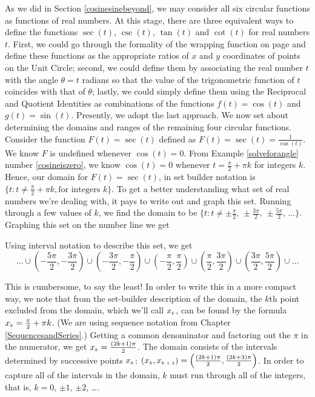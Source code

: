 \medskip

As we did in Section \ref{cosinesinebeyond}, we may consider all six circular functions as functions of real numbers. At this stage, there are three equivalent ways to define the functions $\sec(t)$, $\csc(t)$, $\tan(t)$ and $\cot(t)$ for real numbers $t$.  First, we could go through the formality of the wrapping function on page \pageref{wrappingfunction} and define these functions as the appropriate ratios of  $x$ and $y$ coordinates of points on the Unit Circle;  second, we could define them by associating the real number $t$ with the angle $\theta = t$ radians so that the value of the trigonometric function of $t$ coincides with that of  $\theta$;  lastly, we could simply define them using the Reciprocal and Quotient Identities as combinations of the functions $f(t) = \cos(t)$ and $g(t) = \sin(t)$.  Presently, we adopt the last approach.  We now set about determining the domains and ranges of the remaining four circular functions.  Consider the function $F(t) = \sec(t)$ defined as $F(t) = \sec(t) = \frac{1}{\cos(t)}$.  We know $F$ is undefined whenever $\cos(t) = 0$.  From Example \ref{solveforangle} number \ref{cosineiszero}, we know $\cos(t) = 0$ whenever $t = \frac{\pi}{2} + \pi k$ for integers $k$.  Hence, our domain for $F(t) = \sec(t)$, in set builder notation is  $\{ t : t \neq  \frac{\pi}{2} + \pi k, \text{for integers $k$} \}$.  To get a better understanding what set of real numbers we're dealing with, it pays to write out and graph this set.  Running through a few values of $k$, we find the domain to be  $\{ t : t \neq  \pm \frac{\pi}{2}, \, \pm \frac{3\pi}{2}, \, \pm \frac{5\pi}{2}, \, \ldots \}$.  Graphing this set on the number line we get


\begin{center}
\end{center}

Using interval notation to describe this set, we get  \[ \ldots \cup \left( -\frac{5\pi}{2}, -\frac{3\pi}{2}\right) \cup \left( -\frac{3\pi}{2}, -\frac{\pi}{2}\right) \cup  \left(-\frac{\pi}{2}, \frac{\pi}{2}\right) \cup \left(\frac{\pi}{2}, \frac{3\pi}{2}\right) \cup  \left(\frac{3\pi}{2}, \frac{5\pi}{2}\right) \cup \ldots \]

This is cumbersome, to say the least!  In order to write this in a more compact way, we note that from the set-builder description of the domain, the $k$th point excluded from the domain, which we'll call $x_{\mbox{\tiny $k$}}$, can be found by the formula $x_{\mbox{\tiny $k$}} =  \frac{\pi}{2} + \pi k$.  (We are using sequence notation from Chapter \ref{SequencesandSeries}.)  Getting a common denominator and factoring out the $\pi$ in the numerator, we get  $x_{\mbox{\tiny $k$}} = \frac{(2k+1)\pi}{2}$.  The domain consists of the intervals determined by successive points $x_{\mbox{\tiny $k$}}$:   $\left(x_{\mbox{\tiny $k$}}, x_{\mbox{\tiny $k+1$}}\right) = \left( \frac{(2k+1)\pi}{2},  \frac{(2k+3)\pi}{2}\right)$.  In order to capture all of the intervals in the domain, $k$ must run through all of the integers, that is, $k = 0$, $\pm 1$, $\pm 2$, \ldots.  
\pagebreak

